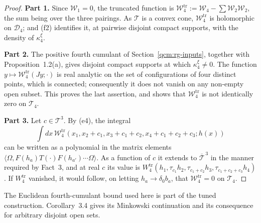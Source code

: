 \documentclass[11pt,letterpaper,reqno]{amsart}
\theoremstyle{definition}
\begin{document}
\begin{proof}
\textbf{Part 1.}
Since $\mathcal W_1=0$, the truncated function is $\mathcal W_4^{\mathrm{tr}}:=\allowbreak \mathcal W_4-\sum\mathcal W_2\mathcal W_2$, the sum being over the three pairings.
As $\mathcal T$ is a convex cone, $\mathcal W_4^{\mathrm{tr}}$ is holomorphic on $\mathcal D_4$; and (f2) identifies it, at pairwise disjoint compact supports, with the density of $\kappa_4^\xi$.

\textbf{Part 2.}
The positive fourth cumulant of Section~\ref{qcm:rg-inputs}, together with Proposition~1.2(a), gives disjoint compact supports at which $\kappa_4^\xi\ne0$.
The function $y\mapsto\mathcal W_4^{\mathrm{tr}}(Jy;\cdot)$ is real analytic on the set of configurations of four distinct points, which is connected; consequently it does not vanish on any non-empty open subset.
This proves the last assertion, and shows that $\mathcal W_4^{\mathrm{tr}}$ is not identically zero on $\mathcal T_4$.

\textbf{Part 3.}
Let $c\in\mathcal T^3$.
By (e4), the integral
\begin{equation*}
\int dx\,\mathcal W_4^{\mathrm{tr}}(x_1,x_2+c_1,x_3+c_1+c_2,x_4+c_1+c_2+c_3;h(x))
\end{equation*}
can be written as a polynomial in the matrix elements $\langle\Omega,F(h_a)T(\cdot)F(h_{a'})\cdots\Omega\rangle$.
As a function of $c$ it extends to $\overline{\mathcal T}^{\,3}$ in the manner required by Fact~3, and at real $c$ its value is $W_4^{\mathrm{tr}}(h_1,\allowbreak \tau_{c_1}h_2,\allowbreak \tau_{c_1+c_2}h_3,\allowbreak \tau_{c_1+c_2+c_3}h_4)$.
If $W_4^{\mathrm{tr}}$ vanished, it would follow, on letting $h_a\to\delta_0b_a$, that $\mathcal W_4^{\mathrm{tr}}=0$ on $\mathcal T_4$.
\end{proof}

The Euclidean fourth-cumulant bound used here is part of the tuned
construction. Corollary~3.4 gives its Minkowski continuation and its
consequence for arbitrary disjoint open sets.
\end{document}
